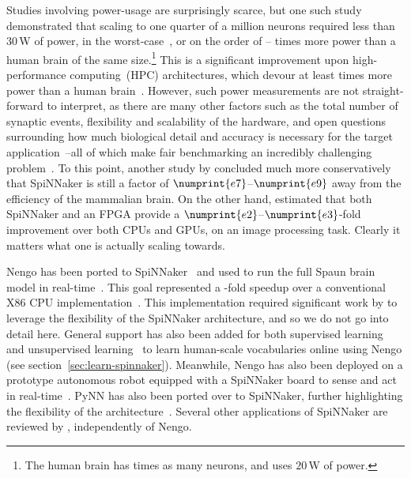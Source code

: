 Studies involving power-usage are surprisingly scarce, but one such study demonstrated that scaling to one quarter of a million neurons required less than $30$\,W of power, in the worst-case~\citep{stromatias2013power}, or on the order of -- times more power than a human brain of the same size.\footnote{
The human brain has  times as many neurons, and uses $20$\,W of power.}
This is a significant improvement upon high-performance computing~(HPC) architectures, which devour at least  times more power than a human brain~\citep{furber2012build}. 
However, such power measurements are not straight-forward to interpret, as there are many other factors such as the total number of synaptic events, flexibility and scalability of the hardware, and open questions surrounding how much biological detail and accuracy is necessary for the target application~\citep{eliasmith2013build}--all of which make fair benchmarking an incredibly challenging problem~\citep{stewart2015closed}.
To this point, another study by \citet{van2018performance} concluded much more conservatively that SpiNNaker is still a factor of $\numprint{e7}$--$\numprint{e9}$ away from the efficiency of the mammalian brain.
On the other hand, \citet{sugiarto2016high} estimated that both SpiNNaker and an FPGA provide a $\numprint{e2}$--$\numprint{e3}$-fold improvement over both CPUs and GPUs, on an image processing task. 
Clearly it matters what one is actually scaling towards.

Nengo has been ported to SpiNNaker~\citep{mundy2015} and used to run the full Spaun brain model in real-time~\citep{mundy2016real}.
This goal represented a -fold speedup over a conventional X86 CPU implementation~\citep{stewart2014large}.
This implementation required significant work by \citet{mundy2016real} to leverage the flexibility of the SpiNNaker architecture, and so we do not go into detail here.
General support has also been added for both supervised learning~\citep{davies2013} and unsupervised learning~\citep{knight2016} to learn human-scale vocabularies online using Nengo (see section~\ref{sec:learn-spinnaker}).
Meanwhile, Nengo has also been deployed on a prototype autonomous robot equipped with a SpiNNaker board to sense and act in real-time~\citep{galluppi2014}.
PyNN has also been ported over to SpiNNaker, further highlighting the flexibility of the architecture~\citep{rhodes2018spynnaker}.
Several other applications of SpiNNaker are reviewed by \citet{rhodes2018spynnaker}, independently of Nengo.

